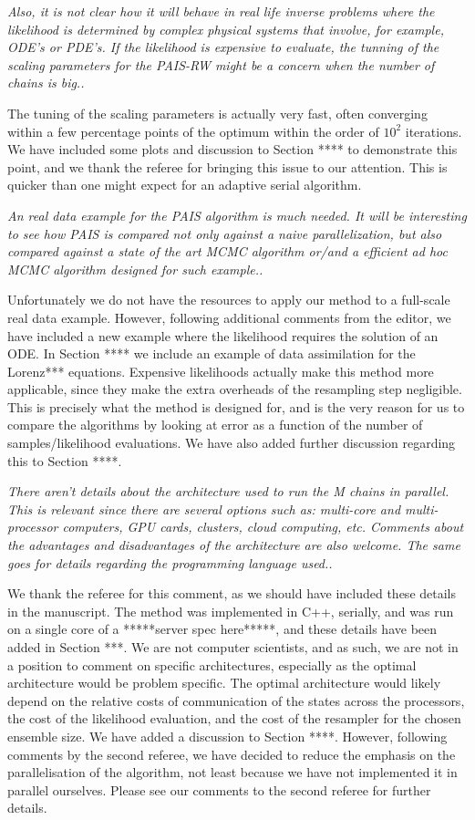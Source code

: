 \documentclass{article}
\newcommand{\comment}[2]{\vspace{0.6cm}{\bf Comment:} {\it #1.}

\vspace{0.3cm}{\bf Answer:} #2}
\begin{document}
\comment{Also, it is not clear how it will behave in real life inverse 
problems where the likelihood is determined by complex physical systems that 
involve, for example, ODE's or PDE's. If the likelihood is expensive to 
evaluate, the tunning of the scaling parameters for the PAIS-RW might be a 
concern when the number of chains is big.}{The tuning of the scaling parameters is actually very fast, often converging within a few percentage points of the optimum within the order of $10^2$ iterations. We have included some plots and discussion to Section **** to demonstrate this point, and we thank the referee for bringing this issue to our attention. This is quicker than one might expect for an adaptive serial algorithm.}

\comment{An real data example for the PAIS algorithm is much needed. It will be 
interesting to see how PAIS is compared not only against a naive 
parallelization, but also compared against a state of the art MCMC algorithm 
or/and a efficient ad hoc MCMC algorithm designed for such example.}{Unfortunately we do not have the resources to apply our method to a full-scale real data example. However, following additional comments from the editor, we have included a new example where the likelihood requires the solution of an ODE. In Section **** we include an example of data assimilation for the Lorenz*** equations. Expensive likelihoods actually make this method more applicable, since they make the extra overheads of the resampling step negligible. This is precisely what the method is designed for, and is the very reason for us to compare the algorithms by looking at error as a function of the number of samples/likelihood evaluations. We have also added further discussion regarding this to Section ****.}

\comment{There aren't details about the architecture used to run the M chains in 
parallel. This is relevant since there are several options such as: multi-core 
and multi-processor computers, GPU cards, clusters, cloud computing, etc. 
Comments about the advantages and disadvantages of the architecture 
are also welcome. The same goes for details regarding the programming language 
used.}{We thank the referee for this comment, as we should have included these details in the manuscript. The method was implemented in C++, serially, and was run on a single core of a *****server spec here*****, and these details have been added in Section ***. We are not computer scientists, and as such, we are not in a position to comment on specific architectures, especially as the optimal architecture would be problem specific. The optimal architecture would likely depend on the relative costs of communication of the states across the processors, the cost of the likelihood evaluation, and the cost of the resampler for the chosen ensemble size. We have added a discussion to Section ****.
However, following comments by the second referee, we have decided to reduce the emphasis on the parallelisation of the algorithm, not least because we have not implemented it in parallel ourselves. Please see our comments to the second referee for further details.}
\end{document}
